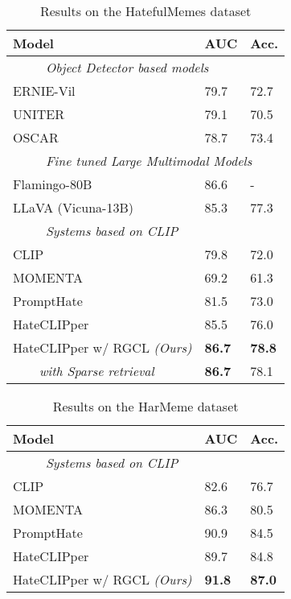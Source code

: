 \documentclass[11pt]{article}
\begin{document}
\begin{table}[htb]
\small
\caption{Results on the HatefulMemes dataset}
\label{tab:results_HMC}
\centering
\begin{tabularx}{0.48\textwidth}{Xll}
\toprule
 Model                     & \textbf{AUC} & \textbf{Acc}.  \\ 
\midrule
\multicolumn{3}{l}{\textit{~~~~~Object Detector based models}} \\
 \midrule
ERNIE-Vil  & 79.7 & 72.7\\
UNITER & 79.1 & 70.5 \\
OSCAR  & 78.7 & 73.4 \\
\midrule
\multicolumn{3}{l}{\textit{~~~~~Fine tuned Large Multimodal Models}}                             \\ \midrule
Flamingo-80B & 86.6 & - \\
LLaVA (Vicuna-13B) & 85.3 & 77.3  \\
\midrule
\multicolumn{3}{l}{\textit{~~~~~Systems based on CLIP}} \\
 \midrule
CLIP  & 79.8 & 72.0 \\
MOMENTA & 69.2 & 61.3\\
PromptHate &81.5 & 73.0 \\ 
HateCLIPper & 85.5 & 76.0    \\
HateCLIPper w/ RGCL \textit{(Ours)} & \textbf{86.7} & \textbf{78.8} \\
\textit{~~~~with Sparse retrieval}  & \textbf{86.7} & 78.1 \\
\bottomrule
\end{tabularx}
\end{table}
\begin{table}[htb]
\small
\caption{Results on the HarMeme dataset}
\label{tab:results_Harmeme}
\centering
\begin{tabularx}{0.48\textwidth}{Xll}
\toprule
 Model                     & \textbf{AUC}  & \textbf{Acc}. \\ 
\midrule
 \multicolumn{3}{l}{\textit{~~~~~Systems based on CLIP}} \\
 \midrule
CLIP & 82.6 & 76.7 \\
MOMENTA & 86.3 & 80.5\\
PromptHate & 90.9 & 84.5 \\ 
HateCLIPper & 89.7  & 84.8    \\
HateCLIPper w/ RGCL \textit{(Ours)} & \textbf{91.8} & \textbf{87.0} \\
\bottomrule
\end{tabularx}
\end{table}
\end{document}
